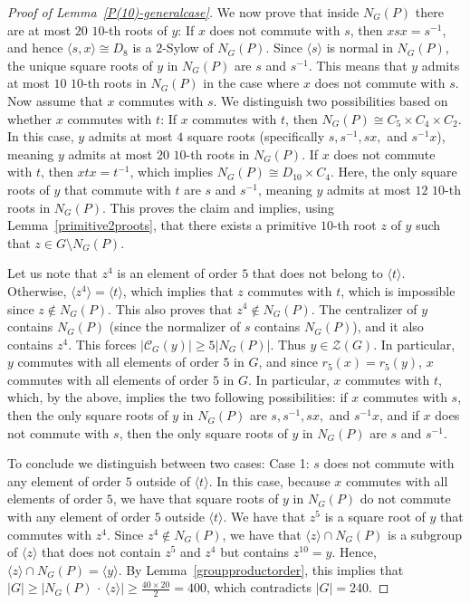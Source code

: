 \documentclass[12pt]{amsart}
\numberwithin{equation}{section}
\theoremstyle{definition}
\theoremstyle{remark}
\begin{document}
\begin{proof}[Proof of Lemma~\ref{P(10)-generalcase}]
    We now prove that inside $N_G(P)$ there are at most $20$ $10$-th roots of $y$: If $x$ does not commute with $s$, then $xsx=s^{-1}$, and hence $\langle s,x\rangle\cong D_8$ is a $2$-Sylow of $N_G(P)$. Since $\langle s\rangle$ is normal in $N_G(P)$, the unique square roots of $y$ in $N_G(P)$ are $s$ and $s^{-1}$. This means that $y$ admits at most $10$ $10$-th roots in $N_G(P)$ in the case where $x$ does not commute with $s$. Now assume that $x$ commutes with $s$. We distinguish two possibilities based on whether $x$ commutes with $t$:
    If $x$ commutes with $t$, then $N_G(P)\cong C_5 \times C_4\times C_2$. In this case, $y$ admits at most $4$ square roots (specifically $s, s^{-1}, sx,$ and $s^{-1}x$), meaning $y$ admits at most $20$ $10$-th roots in $N_G(P)$. If $x$ does not commute with $t$, then $xtx=t^{-1}$, which implies $N_G(P)\cong D_{10}\times C_4$. Here, the only square roots of $y$ that commute with $t$ are $s$ and $s^{-1}$, meaning $y$ admits at most $12$ $10$-th roots in $N_G(P)$. This proves the claim and implies, using Lemma~\ref{primitive2proots}, that there exists a primitive $10$-th root $z$ of $y$ such that $z\in G\setminus N_G(P)$. 
        
    Let us note that $z^{4}$ is an element of order $5$ that does not belong to $\langle t\rangle$. Otherwise, $\langle z^4\rangle=\langle t\rangle$, which implies that $z$ commutes with $t$, which is impossible since $z\notin N_G(P)$. This also proves that $z^4\notin N_G(P)$. The centralizer of $y$ contains $N_G(P)$ (since the normalizer of $s$ contains $N_G(P)$), and it also contains $z^4$. This forces $\bigl|\mathcal{C}_G(y)\bigr|\ge 5 |N_G(P)|$. Thus $y\in \mathcal{Z}(G)$. In particular, $y$ commutes with all elements of order $5$ in $G$, and since $r_5(x)=r_5(y)$, $x$ commutes with all elements of order $5$ in $G$. In particular, $x$ commutes with $t$, which, by the above, implies the two following possibilities: if $x$ commutes with $s$, then the only square roots of $y$ in $N_G(P)$ are $s,s^{-1}, sx,$ and $s^{-1}x$, and if $x$ does not commute with $s$, then the only square roots of $y$ in $N_G(P)$ are $s$ and $s^{-1}$. 
        
    To conclude we distinguish between two cases: 
    Case 1: $s$ does not commute with any element of order $5$ outside of $\langle t\rangle$. In this case, because $x$ commutes with all elements of order $5$, we have that square roots of $y$ in $N_G(P)$ do not commute with any element of order $5$ outside $\langle t\rangle$. We have that $z^5$ is a square root of $y$ that commutes with $z^4$. Since $z^4\notin N_G(P)$, we have that $\langle z\rangle \cap N_G(P)$ is a subgroup of $\langle z\rangle $ that does not contain $z^5$ and $z^4$ but contains $z^{10}=y$. Hence, $\langle z\rangle \cap N_G(P)=\langle y\rangle$. By Lemma~\ref{groupproductorder}, this implies that $|G|\ge \bigl| N_G(P)\,  \cdot\, \langle z\rangle\bigr|\ge \frac{40\times 20}{2}=400$, which contradicts $|G|=240$.
        

\end{proof}
\end{document}
